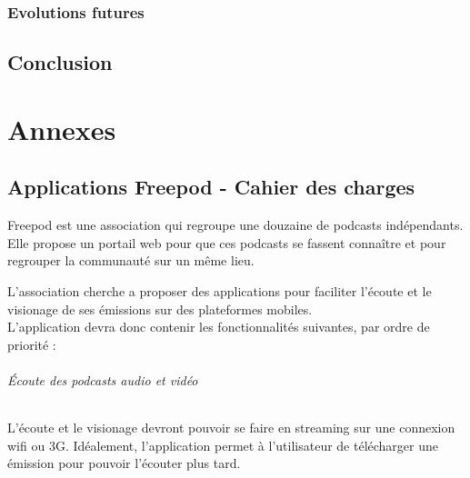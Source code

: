 \documentclass[11pt, french]{report}
\begin{document}
\section{Evolutions futures}





\chapter*{Conclusion}



 

\part*{Annexes}

\appendix

\chapter{Applications Freepod - Cahier des charges}

Freepod est une association qui regroupe une douzaine de podcasts indépendants. Elle propose un portail web pour que ces podcasts se fassent connaître et pour regrouper la communauté sur un même lieu.

L’association cherche a proposer des applications pour faciliter l’écoute et le visionage de ses émissions sur des plateformes mobiles.\\

L’application devra donc contenir les fonctionnalités suivantes, par ordre de priorité :

\paragraph{Écoute des podcasts audio et vidéo}
L’écoute et le visionage devront pouvoir se faire en streaming sur une connexion wifi ou 3G. Idéalement, l’application permet à l’utilisateur de télécharger une émission pour pouvoir l’écouter plus tard.
\end{document}
